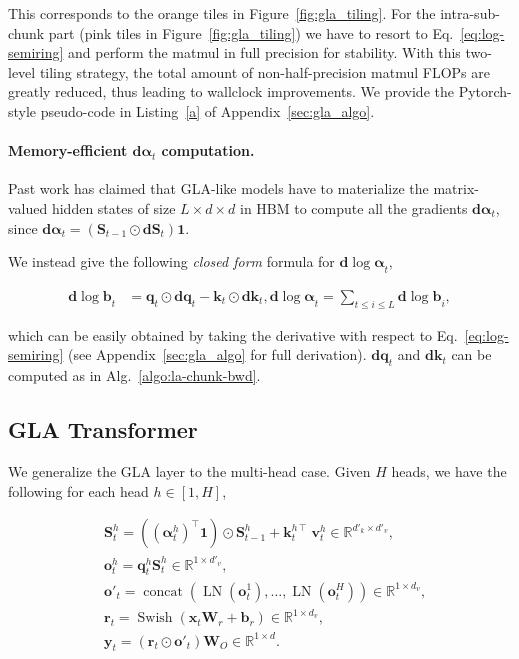 This corresponds to the orange tiles in Figure~\ref{fig:gla_tiling}. For the intra-sub-chunk part (pink tiles in Figure~\ref{fig:gla_tiling}) we have to resort to Eq.~\ref{eq:log-semiring} and perform the matmul in full precision for stability. With this two-level tiling strategy, the total amount of non-half-precision matmul FLOPs are greatly reduced, thus leading to wallclock improvements. We provide the Pytorch-style pseudo-code in Listing~\ref{a} of Appendix~\ref{sec:gla_algo}.

\paragraph{Memory-efficient  \textnormal{${\mathbf{d}\bm{\alpha}}_t$} computation.} Past work \citep[\S 3.1]{mao-2022-fine} has claimed that GLA-like models have to materialize the matrix-valued hidden states of size $L \times d \times d$ in HBM to compute all the gradients ${\mathbf{d}\bm{\alpha}}_t$, since ${\mathbf{d}\bm{\alpha}}_t =  ({\mathbf{S}}_{t-1} \odot \mathbf d{\mathbf{S}}_{t}) \mathbf{1}$. 

We instead give the following \emph{closed form} formula for ${\mathbf{d}\log\bm{\alpha}}_t$,

\begin{align*}
    {\mathbf{d}\log\bm{b}}_t &= {\bm{q}}_t \odot {\mathbf{d}\bm{q}}_t - {\bm{k}}_t \odot {\mathbf{d}\bm{k}}_t,  
   {\mathbf{d}\log\bm{\alpha}}_t  = \sum_{t \leq i \leq L} {\mathbf{d}\log\bm{b}}_i,
\end{align*}

which can be easily obtained by taking the derivative with respect to 
 Eq.~\ref{eq:log-semiring} (see Appendix~\ref{sec:gla_algo} for full derivation). ${\mathbf{d}\bm{q}}_t$ and ${\mathbf{d}\bm{k}}_t$ can be  computed  as in Alg.~\ref{algo:la-chunk-bwd}.

\subsection{GLA Transformer}

\label{sec:gla-full}
We generalize the GLA layer to the multi-head case. Given $H$ heads, we have the following for each head $h \in [1, H]$,

\begin{align*}
    &{\mathbf{S}}^h_{t} =  \left( \left({\bm{\alpha}}_{t}^h\right)^{\top} \mathbf{1} \right) \odot {\mathbf{S}}_{t-1}^h + {\bm{k}}_t^{h \intercal} \, {\bm{v}}^h_t   \in \mathbb{R}^{d'_k \times d'_v}, \\  
& {\bm{o}}^h_{t} = {\bm{q}}_t^{h}{\mathbf{S}}_t^h    \in \mathbb{R}^{1 \times d'_v}, \\ &
{\bm{o}}'_t = \operatorname{concat}(\operatorname{LN}({\bm{o}}^1_t), \dots, \operatorname{LN}({\bm{o}}^H_t)) \in \mathbb{R}^{1 \times d_v}, 
  \\
 &{\bm{r}}_t = \operatorname{Swish}({\bm{x}}_t {\bm{W}}_r + {\bm{b}}_r)  \in \mathbb{R}^{1 \times d_v}, 
 \\ & {\bm{y}}_t = ({\bm{r}}_t \odot {\bm{o}}'_t) {\bm{W}}_{O}  \in \mathbb{R}^{1 \times d}. 
\end{align*}

